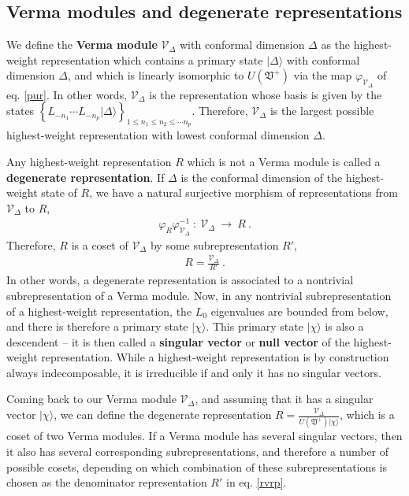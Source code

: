 \documentclass[12pt, a4paper, notitlepage, twoside]{report}
\numberwithin{equation}{section}
\theoremstyle{break}
\begin{document}
\subsection{Verma modules and degenerate representations \label{secvm}}

We define the \textbf{\boldmath Verma module} $\mathcal{V}_\Delta$ with conformal dimension $\Delta$ as the highest-weight representation which contains a primary state $|\Delta\rangle$ with conformal dimension $\Delta$, and which is linearly isomorphic to $U(\mathfrak{V}^+)$ via the map $\varphi_{\mathcal{V}_\Delta}$ of eq. \eqref{pur}.
In other words, $\mathcal{V}_\Delta$ is the representation whose basis is given by the states  $\left\{ L_{-n_1} \cdots L_{-n_p}|\Delta\rangle\right\}_{1\leq n_1\leq n_2\leq \cdots n_p}$.
Therefore, $\mathcal{V}_\Delta$ is the largest possible highest-weight representation with lowest conformal dimension $\Delta$. 

Any  highest-weight representation $R$ which is not a Verma module is called a \textbf{\boldmath degenerate representation}.
If $\Delta$ is the conformal dimension of the highest-weight state of $R$, we have a natural surjective morphism of representations from $\mathcal{V}_\Delta$ to $R$,
\begin{align}
\varphi_R \varphi_{\mathcal{V}_\Delta}^{-1}\ : \  \mathcal{V}_\Delta\ \rightarrow\ R \ .
\end{align}
Therefore, $R$ is a coset of $\mathcal{V}_\Delta$ by some subrepresentation $R'$,
\begin{align}
 R = \frac{\mathcal{V}_\Delta}{R'}\ .
\label{rvrp}
\end{align}
In other words, a degenerate representation is associated to a nontrivial subrepresentation of a Verma module.
Now, in any nontrivial subrepresentation of a highest-weight representation, the $L_0$ eigenvalues are bounded from below, and there is therefore a primary state $|\chi\rangle$.
This primary state $|\chi\rangle$ is also a descendent -- it is then called a \textbf{\boldmath singular vector} or \textbf{\boldmath null vector} of the highest-weight representation.
While a highest-weight representation is by construction always indecomposable, it is irreducible if and only it has no singular vectors.

Coming back to our Verma module $\mathcal{V}_\Delta$, and assuming that it has a singular vector $|\chi\rangle$, we can define the degenerate representation $R = \frac{\mathcal{V}_\Delta}{U(\mathfrak{V}^+)|\chi\rangle}$, which is a coset of two Verma modules.
If a Verma module has several singular vectors, then it also has several corresponding subrepresentations, and therefore a number of possible cosets, depending on which combination of these subrepresentations is chosen as the denominator representation $R'$ in eq. \eqref{rvrp}.
\end{document}
